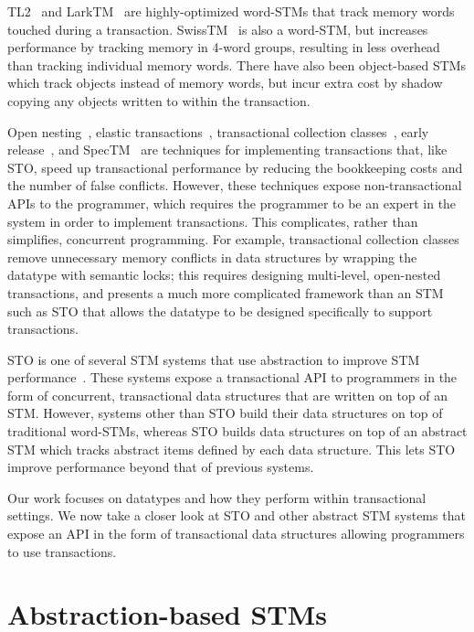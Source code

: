 TL2~\cite{tl2} and LarkTM~\cite{larktm} are highly-optimized word-STMs that track memory words touched during a transaction. SwissTM~\cite{swisstm} is also a word-STM, but increases performance by tracking memory in 4-word groups, resulting in less overhead than tracking individual memory words. There have also been object-based STMs which track objects instead of memory words, but incur extra cost by shadow copying any objects written to within the transaction. 

Open nesting~\cite{opennesting}, elastic transactions~\cite{elastic}, transactional collection classes~\cite{tcc}, early release~\cite{earlyrelease}, and SpecTM~\cite{spectm} are techniques for implementing transactions that, like STO, speed up transactional performance by reducing the bookkeeping costs and the number of false conflicts. However, these techniques expose non-transactional APIs to the programmer, which requires the programmer to be an expert in the system in order to implement transactions. This complicates, rather than simplifies, concurrent programming. For example, transactional collection classes remove unnecessary memory conflicts in data structures by wrapping the datatype with semantic locks; this requires designing multi-level, open-nested transactions, and presents a much more complicated framework than an STM such as STO that allows the datatype to be designed specifically to support transactions.

STO is one of several STM systems that use abstraction to improve STM performance~\cite{predication}\cite{autolock}\cite{optboost}\cite{boost}. These systems expose a transactional API to programmers in the form of concurrent, transactional data structures that are written on top of an STM. However, systems other than STO build their data structures on top of traditional word-STMs, whereas STO builds data structures on top of an abstract STM which tracks abstract items defined by each data structure. This lets STO improve performance beyond that of previous systems. 

Our work focuses on datatypes and how they perform within transactional settings. We now take a closer look at STO and other abstract STM systems that expose an API in the form of transactional data structures allowing programmers to use transactions.

\section{Abstraction-based STMs}

